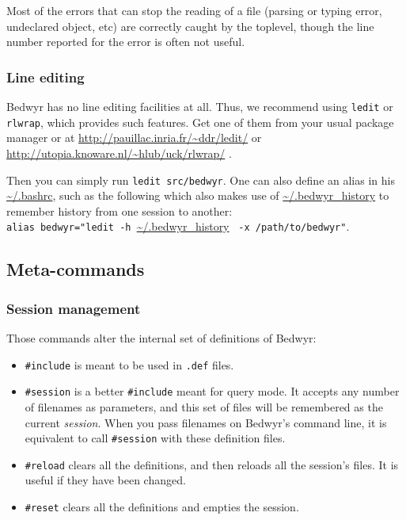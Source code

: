 Most of the errors that can stop the reading of a file (parsing or
typing error, undeclared object, etc) are correctly caught by the
toplevel, though the line number reported for the error is often not
useful.

\subsubsection{Line editing}

Bedwyr has no line editing facilities at all. Thus, we recommend using
\texttt{ledit} or \texttt{rlwrap}, which provides such features. Get one
of them from your usual package manager or at
\urldef{\thisurl}\url{http://pauillac.inria.fr/~ddr/ledit/}\ahrefurl{\thisurl}
or \urldef{\thisurl}\url{http://utopia.knoware.nl/~hlub/uck/rlwrap/}
\ahrefurl{\thisurl}.


Then you can simply run \verb.ledit src/bedwyr.. One can also define
an alias in his \url{~/.bashrc}, such as the following which also
makes use of \url{~/.bedwyr_history} to remember history from one session to
another:\\
\verb|alias bedwyr="ledit -h |\url{~/.bedwyr_history}%
\verb| -x /path/to/bedwyr"|.

\subsection{Meta-commands}

\subsubsection{Session management}

Those commands alter the internal set of definitions of Bedwyr:
\begin{itemize}
  \item
    \verb.#include. is meant to be used in \verb;.def; files.
  \item
    \verb.#session. is a better \verb.#include. meant for query mode.
    It accepts any number of filenames as parameters, and this set of files
    will be remembered as the current \emph{session}.
    When you pass filenames on Bedwyr's command line,
    it is equivalent to call \verb.#session. with these definition files.
  \item
    \verb.#reload. clears all the definitions,
    and then reloads all the session's files. It is useful if they have
    been changed.
  \item
    \verb.#reset. clears all the definitions and empties the session.
\end{itemize}

